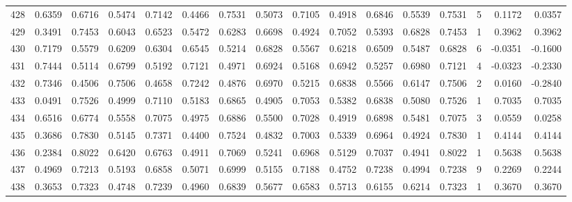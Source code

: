 \begin{tabular}{lrrrrrrrrrrrrrrr}
428 &      0.6359 &  0.6716 &  0.5474 &  0.7142 &  0.4466 &  0.7531 &  0.5073 &  0.7105 &  0.4918 &  0.6846 &   0.5539 &     0.7531 &      5 &                    0.1172 &                     0.0357 \\
429 &      0.3491 &  0.7453 &  0.6043 &  0.6523 &  0.5472 &  0.6283 &  0.6698 &  0.4924 &  0.7052 &  0.5393 &   0.6828 &     0.7453 &      1 &                    0.3962 &                     0.3962 \\
430 &      0.7179 &  0.5579 &  0.6209 &  0.6304 &  0.6545 &  0.5214 &  0.6828 &  0.5567 &  0.6218 &  0.6509 &   0.5487 &     0.6828 &      6 &                   -0.0351 &                    -0.1600 \\
431 &      0.7444 &  0.5114 &  0.6799 &  0.5192 &  0.7121 &  0.4971 &  0.6924 &  0.5168 &  0.6942 &  0.5257 &   0.6980 &     0.7121 &      4 &                   -0.0323 &                    -0.2330 \\
432 &      0.7346 &  0.4506 &  0.7506 &  0.4658 &  0.7242 &  0.4876 &  0.6970 &  0.5215 &  0.6838 &  0.5566 &   0.6147 &     0.7506 &      2 &                    0.0160 &                    -0.2840 \\
433 &      0.0491 &  0.7526 &  0.4999 &  0.7110 &  0.5183 &  0.6865 &  0.4905 &  0.7053 &  0.5382 &  0.6838 &   0.5080 &     0.7526 &      1 &                    0.7035 &                     0.7035 \\
434 &      0.6516 &  0.6774 &  0.5558 &  0.7075 &  0.4975 &  0.6886 &  0.5500 &  0.7028 &  0.4919 &  0.6898 &   0.5481 &     0.7075 &      3 &                    0.0559 &                     0.0258 \\
435 &      0.3686 &  0.7830 &  0.5145 &  0.7371 &  0.4400 &  0.7524 &  0.4832 &  0.7003 &  0.5339 &  0.6964 &   0.4924 &     0.7830 &      1 &                    0.4144 &                     0.4144 \\
436 &      0.2384 &  0.8022 &  0.6420 &  0.6763 &  0.4911 &  0.7069 &  0.5241 &  0.6968 &  0.5129 &  0.7037 &   0.4941 &     0.8022 &      1 &                    0.5638 &                     0.5638 \\
437 &      0.4969 &  0.7213 &  0.5193 &  0.6858 &  0.5071 &  0.6999 &  0.5155 &  0.7188 &  0.4752 &  0.7238 &   0.4994 &     0.7238 &      9 &                    0.2269 &                     0.2244 \\
438 &      0.3653 &  0.7323 &  0.4748 &  0.7239 &  0.4960 &  0.6839 &  0.5677 &  0.6583 &  0.5713 &  0.6155 &   0.6214 &     0.7323 &      1 &                    0.3670 &                     0.3670 \\

\end{tabular}
